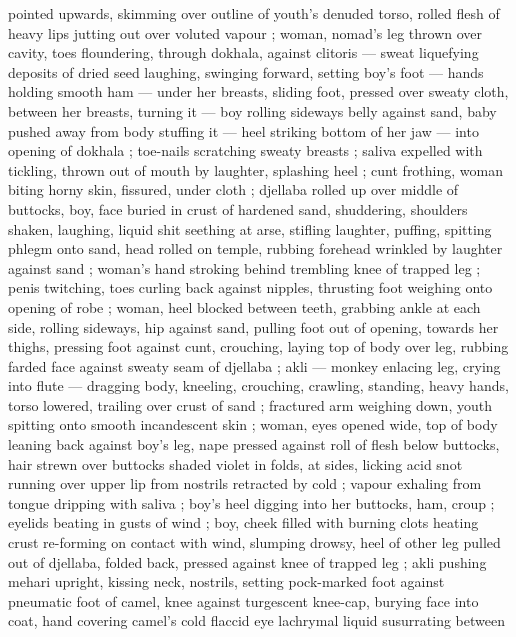 pointed upwards, skimming over outline of youth's denuded torso, 
rolled flesh of heavy lips jutting out over voluted vapour ; woman, 
nomad's leg thrown over cavity, toes floundering, through dokhala, 
against clitoris --- sweat liquefying deposits of dried seed {\dashcom}
laughing, swinging forward, setting boy's foot --- hands holding 
smooth ham --- under her breasts, sliding foot, pressed over sweaty 
cloth, between her breasts, turning it --- boy rolling sideways belly 
against sand, baby pushed away from body {\dashcom} stuffing it --- heel 
striking bottom of her jaw --- into opening of dokhala ; toe-nails 
scratching sweaty breasts ; saliva expelled with tickling, thrown out 
of mouth by laughter, splashing heel ; cunt frothing, woman biting 
horny skin, fissured, under cloth ; djellaba rolled up over middle of 
buttocks, boy, face buried in crust of hardened sand, shuddering, 
shoulders shaken, laughing, liquid shit seething at arse, stifling 
laughter, puffing, spitting phlegm onto sand, head rolled on temple, 
rubbing forehead wrinkled by laughter against sand ; woman's hand 
stroking behind trembling knee of trapped leg ; penis twitching, toes 
curling back against nipples, thrusting foot weighing onto opening of 
robe ; woman, heel blocked between teeth, grabbing ankle at each 
side, rolling sideways, hip against sand, pulling foot out of opening, 
towards her thighs, pressing foot against cunt, crouching, laying top 
of body over leg, rubbing farded face against sweaty seam of 
djellaba ; akli --- monkey enlacing leg, crying into flute --- dragging 
body, kneeling, crouching, crawling, standing, heavy hands, torso 
lowered, trailing over crust of sand ; fractured arm weighing down, 
youth spitting onto smooth incandescent skin ; woman, eyes opened 
wide, top of body leaning back against boy's leg, nape pressed 
against roll of flesh below buttocks, hair strewn over buttocks shaded 
violet in folds, at sides, licking acid snot running over upper lip from 
nostrils retracted by cold ; vapour exhaling from tongue dripping with 
saliva ; boy's heel digging into her buttocks, ham, croup ; eyelids 
beating in gusts of wind ; boy, cheek filled with burning clots heating 
crust re-forming on contact with wind, slumping drowsy, heel of other 
leg pulled out of djellaba, folded back, pressed against knee of 
trapped leg ; akli pushing mehari upright, kissing neck, nostrils, 
setting pock-marked foot against pneumatic foot of camel, knee 
against turgescent knee-cap, burying face into coat, hand covering 
camel's cold flaccid eye {\col} lachrymal liquid susurrating between 
